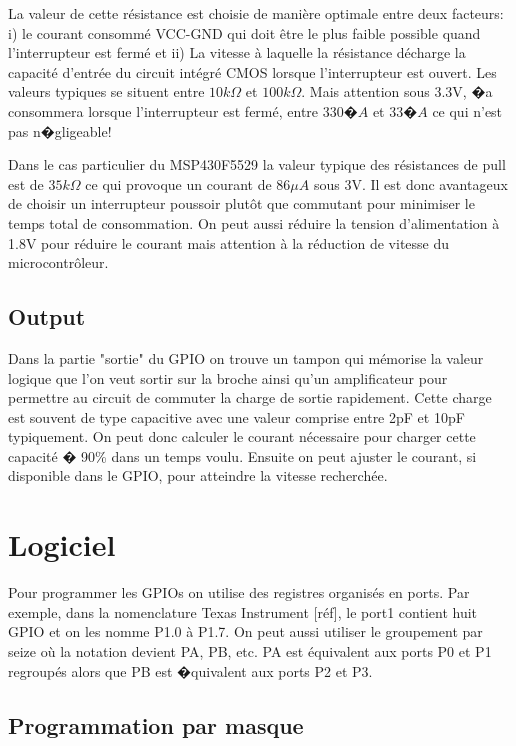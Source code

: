 La valeur de cette résistance est choisie de manière optimale entre deux facteurs: i) le courant consommé VCC-GND qui doit être le plus faible possible quand l'interrupteur est fermé et ii) La vitesse à laquelle la résistance décharge la capacité d'entrée du circuit intégré CMOS lorsque l'interrupteur est ouvert. Les valeurs typiques se situent entre $10k\Omega$ et $100k\Omega$. Mais attention sous 3.3V, �a consommera lorsque l'interrupteur est fermé, entre $330�A$ et $33�A$ ce qui n'est pas n�gligeable!

Dans le cas particulier du MSP430F5529 la valeur typique des résistances de pull est de $35k\Omega$ ce qui provoque un courant de $86\mu A$ sous 3V. Il est donc avantageux de choisir un interrupteur poussoir plutôt que commutant pour minimiser le temps total de consommation. On peut aussi réduire la tension d'alimentation à 1.8V pour réduire le courant mais attention à la réduction de vitesse du microcontrôleur.

\subsection{Output}

Dans la partie "sortie" du GPIO on trouve un tampon qui mémorise la valeur logique que l'on veut sortir sur la broche ainsi qu'un amplificateur pour permettre au circuit de commuter la charge de sortie rapidement. Cette charge est souvent de type capacitive avec une valeur comprise entre 2pF et 10pF typiquement. On peut donc calculer le courant nécessaire pour charger cette capacité � 90\% dans un temps voulu. Ensuite on peut ajuster le courant, si disponible dans le GPIO, pour atteindre la vitesse recherchée.

\section{Logiciel}

Pour programmer les GPIOs on utilise des registres organisés en ports. Par exemple, dans la nomenclature Texas Instrument [réf], le port1 contient huit GPIO et on les nomme P1.0 à P1.7. On peut aussi utiliser le groupement par seize où la notation devient PA, PB, etc. PA est équivalent aux ports P0 et P1 regroupés alors que PB est �quivalent aux ports P2 et P3. 

\subsection{Programmation par masque}


